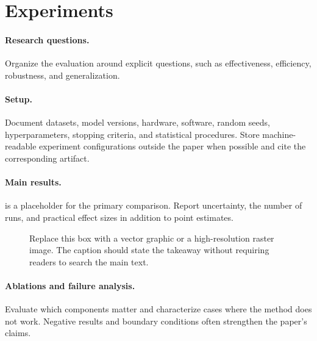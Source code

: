 \section{Experiments}
\label{sec:experiments}

\paragraph{Research questions.}
Organize the evaluation around explicit questions, such as effectiveness, efficiency, robustness, and generalization.

\paragraph{Setup.}
Document datasets, model versions, hardware, software, random seeds, hyperparameters, stopping criteria, and statistical procedures. Store machine-readable experiment configurations outside the paper when possible and cite the corresponding artifact.



\paragraph{Main results.}
 is a placeholder for the primary comparison. Report uncertainty, the number of runs, and practical effect sizes in addition to point estimates.

\begin{figure}[t]
  \centering
  \fbox{\rule{0pt}{1.25in}\rule{0.9\columnwidth}{0pt}}
  \caption{Replace this box with a vector graphic or a high-resolution raster image. The caption should state the takeaway without requiring readers to search the main text.}
  \label{fig:placeholder}
\end{figure}

\paragraph{Ablations and failure analysis.}
Evaluate which components matter and characterize cases where the method does not work. Negative results and boundary conditions often strengthen the paper's claims.

